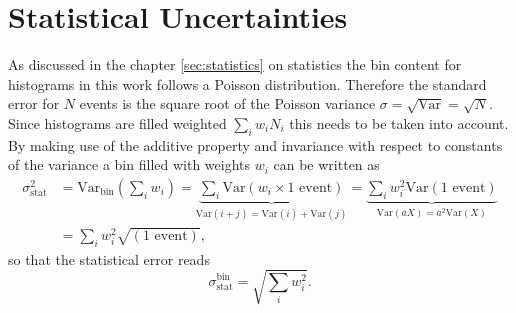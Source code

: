 \section{Statistical Uncertainties}
As discussed in the chapter \ref{sec:statistics} on statistics the bin content for histograms in this work follows a Poisson distribution. Therefore the standard error for $N$ events is the square root of the Poisson variance $\sigma=\sqrt{\text{Var}}=\sqrt{N}$. Since histograms are filled weighted $\sum_i w_i N_i$ this needs to be taken into account. By making use of the additive property and invariance with respect to constants of the variance a bin filled with weights $w_i$ can be written as
\begin{align}
    \sigma_\text{stat}^2 & = \text{Var}_\text{bin}\left(\sum_i w_i\right)
    =
    \underbrace{\sum_i \text{Var}(w_i \times 1\text{ event})}_{\text{Var}(i+j)=\text{Var}(i)+\text{Var}(j)}
    =
    \underbrace{\sum_i w_i^2\text{Var}(1\text{ event})}_{\text{Var}(aX)=a^2\text{Var}(X)} \\ \nonumber
                         & =\sum_i w_i^2\sqrt{(1\text{ event})},
\end{align}
so that the statistical error reads
\begin{equation}
    \sigma_\text{stat}^\text{bin}=\sqrt{\sum_i w_i^2}.
\end{equation}

